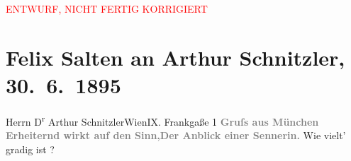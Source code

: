 
\begin{center}
            \textcolor{red}{ENTWURF, NICHT FERTIG KORRIGIERT}
                      \end{center}
            
         \renewcommand{\erwaehnteOrte}{Orte: Frankgasse, IX., Alsergrund, München, Wien}
         \renewcommand{\erwaehnteWerke}{}
               \section[Felix Salten an Arthur Schnitzler, 30. 6. 1895]{ Felix Salten an Arthur Schnitzler, 30. 6. 1895}\nopagebreak{}\rehead{ }\begin{ledgroupsized}[t]{13cm}\normalsize\beginnumbering \toendnotes[C]{\smallbreak\pagebreak[2]} 
\pstart{}{\pb}Herrn D\textsuperscript{r} Arthur Schnitzler\pend{}\pstart{}Wien\pend{}\pstart{}IX. Frankgaße 1\pend{}{\bigskip}\pstart
           \noindent{}\centering{}{\pb}\textcolor{gray}{\textbf{Gruſs aus München}}\pend
           \stanza{}\textcolor{gray}{\textbf{Erheiternd wirkt auf den Sinn,}}\textcolor{gray}{\textbf{Der Anblick einer Sennerin.}}\stanzaend{}\pstart
           Wie vielt' gradig ist ? \pend
           
         
         \endnumbering{}\end{ledgroupsized}\begin{anhang}\end{anhang}\newcommand{\dateiname}{L03157}\newcommand{\titel}{Felix Salten an Arthur Schnitzler, 30. 6. 1895}\newcommand{\editorInnen}{Martin Anton Müller und Laura Untner}
      
